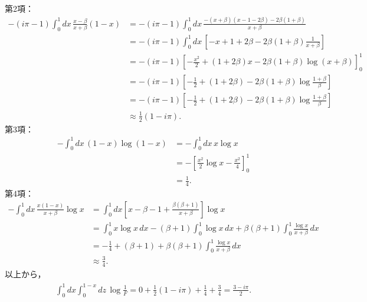 第2項：
\begin{align*}
  - (i\pi - 1) \int_0^1 dx \, \frac{x-\beta}{x+\beta}(1-x)
  &= - (i\pi - 1) \int_0^1 dx \, \frac{-(x+\beta)(x-1-2\beta) - 2\beta(1+\beta)}{x+\beta} \\
  &= - (i\pi - 1) \int_0^1 dx \, \left[ - x + 1 + 2\beta - 2\beta(1+\beta) \frac{1}{x+\beta} \right] \\
  &= - (i\pi - 1) \left[ - \frac{x^2}{2} + (1 + 2\beta)x - 2\beta(1+\beta) \log (x+\beta) \right]_0^1 \\
  &= - (i\pi - 1) \left[ - \frac{1}{2} + (1 + 2\beta) - 2\beta(1+\beta) \log \frac{1+\beta}{\beta} \right] \\
  &= - (i\pi - 1) \left[ - \frac{1}{2} + (1 + 2\beta) - 2\beta(1+\beta) \log \frac{1+\beta}{\beta} \right] \\
  &\approx \frac{1}{2} (1 - i\pi) .
\end{align*}
第3項：
\begin{align*}
  -\int_0^1 dx \, (1-x) \log (1-x) &= -\int_0^1 dx \, x \log x \\
  &= - \left[ \frac{x^2}{2} \log x - \frac{x^2}{4} \right]_0^1 \\
  &= \frac{1}{4} .
\end{align*}
第4項：
\begin{align*}
  - \int_0^1 dx \, \frac{x(1-x)}{x+\beta} \log x
  &= \int_0^1 dx \left[ x - \beta - 1 + \frac{\beta(\beta+1)}{x+\beta} \right] \log x \\
  &= \int_0^1 x \log x \, dx - (\beta+1) \int_0^1 \log x \, dx + \beta(\beta+1) \int_0^1 \frac{\log x}{x+\beta} \, dx \\
  &= - \frac{1}{4} + (\beta+1) + \beta(\beta+1) \int_0^1 \frac{\log x}{x+\beta} \, dx \\
  &\approx \frac{3}{4} .
\end{align*}
以上から，
\begin{align}
  \begin{split}
    \int_0^1 dx \int_0^{1-x} dz \, \log \frac{1}{F}
    = 0 + \frac{1}{2} (1 - i\pi) + \frac{1}{4} + \frac{3}{4}
    = \frac{3 - i\pi}{2} .
  \end{split}
  \label{FP1_I_e_2}
\end{align}

